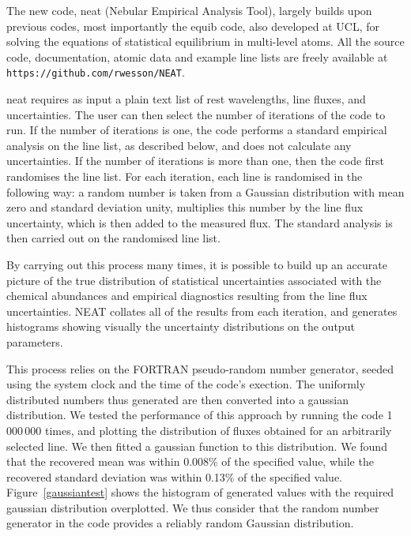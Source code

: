 \documentclass[useAMS,usenatbib]{mn2e}
\begin{document}
The new code, {\sc neat} (Nebular Empirical Analysis Tool), largely builds upon previous codes, most importantly the {\sc equib} code, also developed at UCL, for solving the equations of statistical equilibrium in multi-level atoms.  All the source code, documentation, atomic data and example line lists are freely available at \texttt{https://github.com/rwesson/NEAT}.

{\sc neat} requires as input a plain text list of rest wavelengths, line fluxes, and uncertainties.  The user can then select the number of iterations of the code to run.  If the number of iterations is one, the code performs a standard empirical analysis on the line list, as described below, and does not calculate any uncertainties.  If the number of iterations is more than one, then the code first randomises the line list. For each iteration, each line is randomised in the following way: a random number is taken from a Gaussian distribution with mean zero and standard deviation unity, multiplies this number by the line flux uncertainty, which is then added to the measured flux. The standard analysis is then carried out on the randomised line list.

By carrying out this process many times, it is possible to build up an accurate picture of the true distribution of statistical uncertainties associated with the chemical abundances and empirical diagnostics resulting from the line flux uncertainties. {\sc NEAT} collates all of the results from each iteration, and generates histograms showing visually the uncertainty distributions on the output parameters.

This process relies on the FORTRAN pseudo-random number generator, seeded using the system clock and the time of the code's exection.  The uniformly distributed numbers thus generated are then converted into a gaussian distribution.  We tested the performance of this approach by running the code 1\,000\,000 times, and plotting the distribution of fluxes obtained for an arbitrarily selected line.  We then fitted a gaussian function to this distribution.  We found that the recovered mean was within 0.008\% of the specified value, while the recovered standard deviation was within 0.13\% of the specified value.  Figure~\ref{gaussiantest} shows the histogram of generated values with the required gaussian distribution overplotted.  We thus consider that the random number generator in the code provides a reliably random Gaussian distribution.
\end{document}
